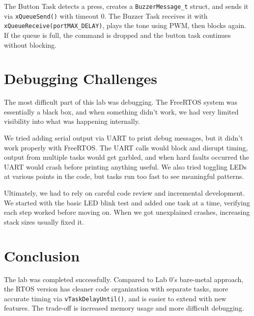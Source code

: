 \documentclass[11pt,letterpaper]{article}
\begin{document}
The Button Task detects a press, creates a \texttt{BuzzerMessage\_t} struct, and sends it via \texttt{xQueueSend()} with timeout 0. The Buzzer Task receives it with \texttt{xQueueReceive(portMAX\_DELAY)}, plays the tone using PWM, then blocks again. If the queue is full, the command is dropped and the button task continues without blocking.

\section{Debugging Challenges}

The most difficult part of this lab was debugging. The FreeRTOS system was essentially a black box, and when something didn't work, we had very limited visibility into what was happening internally.

We tried adding serial output via UART to print debug messages, but it didn't work properly with FreeRTOS. The UART calls would block and disrupt timing, output from multiple tasks would get garbled, and when hard faults occurred the UART would crash before printing anything useful. We also tried toggling LEDs at various points in the code, but tasks run too fast to see meaningful patterns.

Ultimately, we had to rely on careful code review and incremental development. We started with the basic LED blink test and added one task at a time, verifying each step worked before moving on. When we got unexplained crashes, increasing stack sizes usually fixed it.

\section{Conclusion}

The lab was completed successfully. Compared to Lab 0's bare-metal approach, the RTOS version has cleaner code organization with separate tasks, more accurate timing via \texttt{vTaskDelayUntil()}, and is easier to extend with new features. The trade-off is increased memory usage and more difficult debugging.
\end{document}
